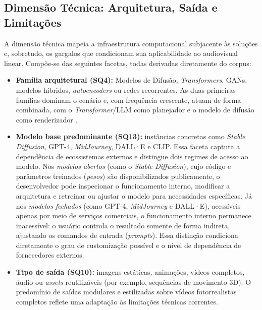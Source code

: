 \subsection{Dimensão Técnica: Arquitetura, Saída e Limitações}

A dimensão técnica mapeia a infraestrutura computacional subjacente às soluções e, sobretudo, os gargalos que condicionam sua aplicabilidade ao audiovisual linear. Compõe-se das seguintes facetas, todas derivadas diretamente do corpus:

\begin{itemize}
    \item \textbf{Família arquitetural (SQ4):} Modelos de Difusão, \textit{Transformers}, GANs, modelos híbridos, \textit{autoencoders} ou redes recorrentes. As duas primeiras famílias dominam o cenário e, com frequência crescente, atuam de forma combinada, com o \textit{Transformer}/LLM como planejador e o modelo de difusão como renderizador \citep{dhariwal2021diffusion, rombach2022high, vaswani2017attention}.
    \item \textbf{Modelo base predominante (SQ13):} instâncias concretas como \textit{Stable Diffusion}, GPT-4, \textit{MidJourney}, DALL·E e CLIP. Essa faceta captura a dependência de ecossistemas externos e distingue dois regimes de acesso ao modelo. Nos \textit{modelos abertos} (como o \textit{Stable Diffusion}), cujo código e parâmetros treinados (\textit{pesos}) são disponibilizados publicamente, o desenvolvedor pode inspecionar o funcionamento interno, modificar a arquitetura e retreinar ou ajustar o modelo para necessidades específicas. Já nos \textit{modelos fechados} (como GPT-4, \textit{MidJourney} e DALL·E), acessíveis apenas por meio de serviços comerciais, o funcionamento interno permanece inacessível: o usuário controla o resultado somente de forma indireta, ajustando os comandos de entrada (\textit{prompts}). Essa distinção condiciona diretamente o grau de customização possível e o nível de dependência de fornecedores externos.
    \item \textbf{Tipo de saída (SQ10):} imagens estáticas, animações, vídeos completos, áudio ou \textit{assets} reutilizáveis (por exemplo, sequências de movimento 3D). O predomínio de saídas modulares e estilizadas sobre vídeos fotorrealistas completos reflete uma adaptação às limitações técnicas correntes.

\end{itemize}
